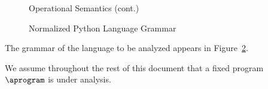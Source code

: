 \documentclass{article}
\begin{document}
    \begin{figure}\center
      \ContinuedFloat
        \begin{mathpar}


        \end{mathpar}
        \caption{Operational Semantics (cont.)}
        \label{fig_languageOS}
    \end{figure}

    \begin{figure}\center
        \begin{grammar}

        \end{grammar}
        \caption{Normalized Python Language Grammar}
        \label{fig_languageGrammar}
    \end{figure}

    The grammar of the language to be analyzed appears in Figure~\ref{fig_languageGrammar}.

    We assume throughout the rest of this document that a fixed program $\aprogram$ is under analysis.  
\end{document}
